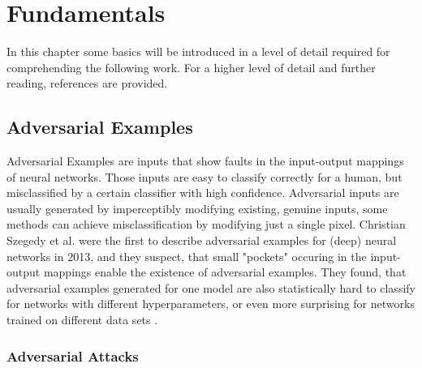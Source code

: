 \documentclass[draft,final]{vutinfth} %
\begin{document}
\chapter{Fundamentals}

In this chapter some basics will be introduced in a level of detail required for comprehending the following work.
For a higher level of detail and further reading, references are provided.

\section{Adversarial Examples}

Adversarial Examples are inputs that show faults in the input-output mappings of neural networks.
Those inputs are easy to classify correctly for a human, but misclassified by a certain classifier with high confidence.
Adversarial inputs are usually generated by imperceptibly modifying existing, genuine inputs, some methods can achieve misclassification by modifying just a single pixel\cite{Jiawei2017}.
Christian Szegedy et al. were the first to describe adversarial examples for (deep) neural networks in 2013, and they suspect, that small "pockets" occuring in the input-output mappings enable the existence of adversarial examples.
They found, that adversarial examples generated for one model are also statistically hard to classify for networks with different hyperparameters, or even more surprising for networks trained on different data sets \cite{Szegedy2013}.

\subsection{Adversarial Attacks}
\end{document}
